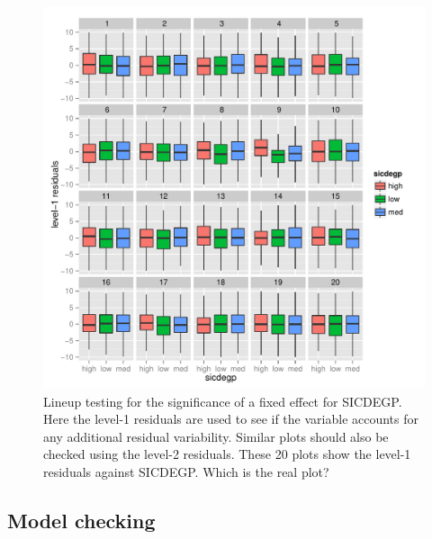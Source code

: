 \documentclass{article} %
\begin{document}
\begin{figure}
	\centering
	\includegraphics[width=\textwidth]{sicdegp_level1_lineup9.pdf}
	\caption{\label{fig:lineup-ranef1} Lineup testing for the significance of a fixed effect for SICDEGP. Here the level-1 residuals are used to see if the variable accounts for any additional residual variability. Similar plots should also be checked using the level-2 residuals. These 20 plots show the level-1 residuals against SICDEGP. Which is the real plot?}
\end{figure}



\subsection{Model checking}
\end{document}
